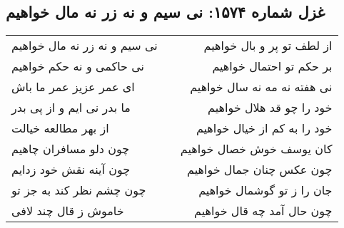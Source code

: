 \begin{center}
\section*{غزل شماره ۱۵۷۴: نی سیم و نه زر نه مال خواهیم}
\label{sec:1574}
\begin{longtable}{l p{0.5cm} r}
نی سیم و نه زر نه مال خواهیم
&&
از لطف تو پر و بال خواهیم
\\
نی حاکمی و نه حکم خواهیم
&&
بر حکم تو احتمال خواهیم
\\
ای عمر عزیز عمر ما باش
&&
نی هفته نه مه نه سال خواهیم
\\
ما بدر نی ایم و از پی بدر
&&
خود را چو قد هلال خواهیم
\\
از بهر مطالعه خیالت
&&
خود را به کم از خیال خواهیم
\\
چون دلو مسافران چاهیم
&&
کان یوسف خوش خصال خواهیم
\\
چون آینه نقش خود زدایم
&&
چون عکس چنان جمال خواهیم
\\
چون چشم نظر کند به جز تو
&&
جان را ز تو گوشمال خواهیم
\\
خاموش ز قال چند لافی
&&
چون حال آمد چه قال خواهیم
\\
\end{longtable}
\end{center}
